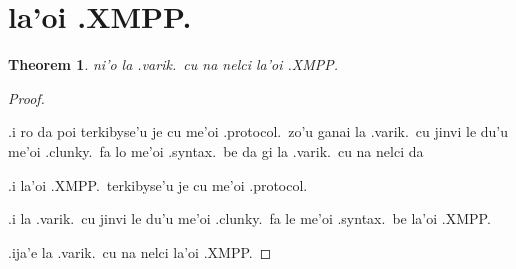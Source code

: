 \documentclass{article}
\newtheorem{thm}{Theorem}
\begin{document}
\section{la'oi .XMPP.}
\begin{thm}
	ni'o la .varik.\ cu na nelci la'oi .XMPP.
\end{thm}
\begin{proof}
	${}$

	.i ro da poi terkibyse'u je cu me'oi .protocol.\ zo'u ganai la .varik.\ cu jinvi le du'u me'oi .clunky.\ fa lo me'oi .syntax.\ be da gi la .varik.\ cu na nelci da

	.i la'oi .XMPP.\ terkibyse'u je cu me'oi .protocol.

	.i la .varik.\ cu jinvi le du'u me'oi .clunky.\ fa le me'oi .syntax.\ be la'oi .XMPP.

	.ija'e la .varik.\ cu na nelci la'oi .XMPP.
\end{proof}
\end{document}
